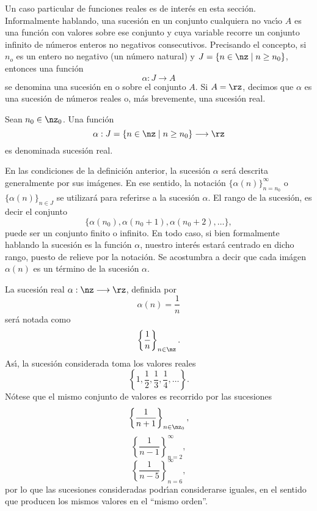 Un caso particular de funciones reales es de inter\'{e}s en esta secci\'{o}n.
Informalmente hablando, una
%
sucesi\'{o}n en un conjunto cualquiera no vac\'{\i}o $A$ es una funci\'{o}n
con valores sobre ese conjunto y cuya variable recorre un conjunto infinito de
n\'{u}meros enteros no negativos consecutivos. Precisando el concepto, si
$n_{o}$ es un entero no negativo (un n\'{u}mero natural) y $J=\{n\in\nz\mid
n\geq n_{0}\}$, entonces una funci\'{o}n
\[
\alpha:J\longrightarrow A
\]
se denomina una sucesi\'{o}n en o sobre el conjunto $A$. Si $A=\rz$, decimos
que $\alpha$ es una sucesi\'{o}n de n\'{u}meros reales o, m\'{a}s brevemente,
una sucesi\'{o}n real.

\begin{definition}
Sean $n_{0}\in\nz_{0}$. Una funci\'{o}n
\[
\alpha:J=\{n\in\nz\mid n\geq n_{0}\}\longrightarrow\rz
\]
es denominada sucesi\'{o}n real.
\end{definition}

En las condiciones de la definici\'{o}n anterior, la sucesi\'{o}n $\alpha$
ser\'{a} descrita generalmente por sus im\'{a}genes. En ese sentido, la
notaci\'{o}n $\{\alpha(n)\}_{n=n_{0}}^{\infty}$ o $\{\alpha(n)\}_{n\in J}$ se
utilizar\'{a} para referirse a la sucesi\'{o}n $\alpha$. El rango de la
sucesi\'{o}n, es decir el conjunto
\[
\{\alpha(n_{0}),\alpha(n_{0}+1),\alpha(n_{0}+2),\dots\},
\]
puede ser un conjunto finito o infinito. En todo caso, si bien formalmente
hablando la sucesi\'{o}n es la funci\'{o}n $\alpha$, nuestro inter\'{e}s
estar\'{a} centrado en dicho rango, puesto de relieve por la notaci\'{o}n. Se
acostumbra a decir que cada im\'{a}gen $\alpha(n)$ es un t\'{e}rmino de la
sucesi\'{o}n $\alpha$.

\begin{example}
La sucesi\'{o}n real $\alpha:\nz\longrightarrow\rz$, definida por
\[
\alpha(n)=\frac{1}{n}%
\]
ser\'{a} notada como
\[
\left\{  \frac{1}{n}\right\}  _{n\in\nz}.
\]
As\'{\i}, la sucesi\'{o}n considerada toma los valores reales
\[
\left\{  1,\frac{1}{2},\frac{1}{3},\frac{1}{4},\dots\right\}  .
\]
N\'{o}tese que el mismo conjunto de valores es recorrido por las sucesiones
\[
\left\{  \frac{1}{n+1}\right\}  _{n\in\nz_{0}},
\]%
\[
\left\{  \frac{1}{n-1}\right\}  _{n=2}^{\infty},
\]%
\[
\left\{  \frac{1}{n-5}\right\}  _{n=6}^{\infty},
\]
por lo que las sucesiones consideradas podr\'{\i}an considerarse iguales, en
el sentido que producen los mismos valores en el \textquotedblleft mismo
orden\textquotedblright.
\end{example}

